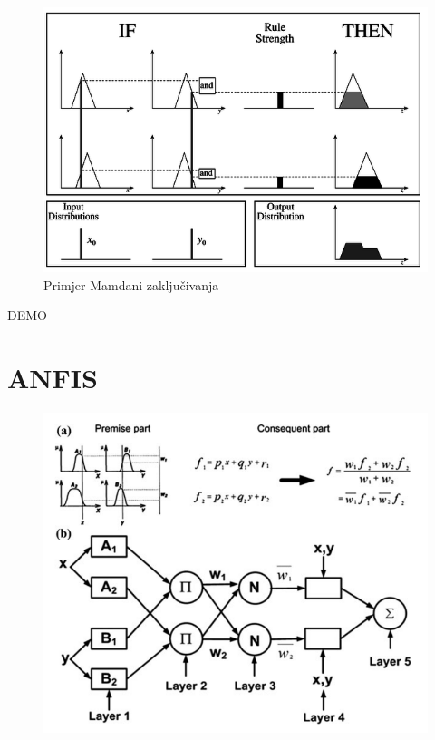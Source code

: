 \documentclass{beamer}
\begin{document}
\begin{frame}{}
\begin{figure}[h]
  \includegraphics[width=\textwidth]{img/fuzzy_inf.PNG}
  \caption{Primjer Mamdani zaključivanja}
\end{figure}
\end{frame}

\begin{frame}{DEMO}
\end{frame}



\section{ANFIS}

\begin{frame}{}
\begin{figure}[h]
  \includegraphics[width=\textwidth]{img/anfis.PNG}
\end{figure}
\end{frame}
\end{document}
